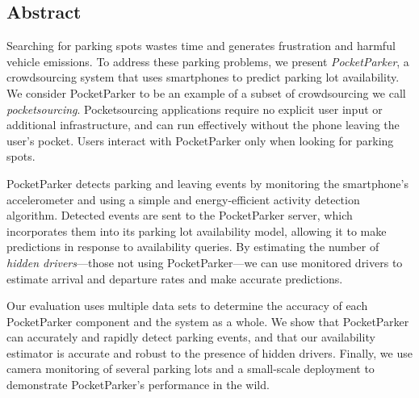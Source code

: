 \subsection*{Abstract}

Searching for parking spots wastes time and generates frustration and harmful
vehicle emissions. To address these parking problems, we present
\textit{PocketParker}, a crowdsourcing system that uses smartphones to
predict parking lot availability. We consider PocketParker to be an example of
a subset of crowdsourcing we call \textit{pocketsourcing}. Pocketsourcing
applications require no explicit user input or additional infrastructure, and
can run effectively without the phone leaving the user's pocket. Users
interact with PocketParker only when looking for parking spots.

PocketParker detects parking and leaving events by monitoring the
smartphone's accelerometer and using a simple and energy-efficient activity
detection algorithm. Detected events are sent to the PocketParker server,
which incorporates them into its parking lot availability model, allowing it
to make predictions in response to availability queries. By estimating the
number of \textit{hidden drivers}---those not using PocketParker---we can use
monitored drivers to estimate arrival and departure rates and make accurate
predictions.

Our evaluation uses multiple data sets to determine the accuracy of each
PocketParker component and the system as a whole. We show that PocketParker
can accurately and rapidly detect parking events, and that our availability
estimator is accurate and robust to the presence of hidden drivers. Finally,
we use camera monitoring of several parking lots and a small-scale deployment
to demonstrate PocketParker's performance in the wild.
